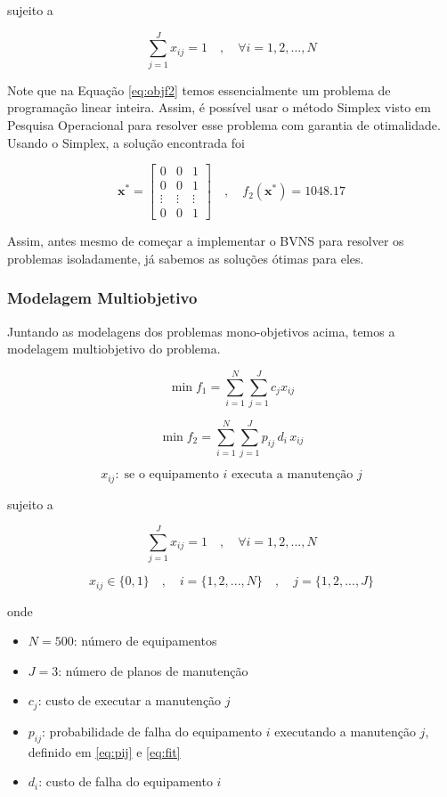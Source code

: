 \documentclass[conference]{IEEEtran}
\newcommand{\un}[1]{\;\text{#1}}
\begin{document}
\noindent sujeito a 

\begin{equation}\label{eq:restf2}
	\sum_{j=1}^{J} x_{ij} = 1 \quad , \quad \forall i = {1, 2, ..., N}
\end{equation}

Note que na Equação \ref{eq:objf2} temos essencialmente um problema de programação linear inteira.
Assim, é possível usar o método Simplex visto em Pesquisa Operacional para resolver esse problema
com garantia de otimalidade. Usando o Simplex, a solução encontrada foi 

\[ \mathbf{x^{*}}  = \begin{bmatrix} 
	0 & 0 & 1 \\
	0 & 0 & 1 \\
	\vdots & \vdots & \vdots \\
	0 &  0      & 1 
	\end{bmatrix} \quad , \quad f_2\left(\mathbf{x^{*}}\right) = 1048.17  \]

Assim, antes mesmo de começar a implementar o BVNS para resolver os problemas isoladamente, 
já sabemos as soluções ótimas para eles.

\subsubsection{Modelagem Multiobjetivo}

Juntando as modelagens dos problemas mono-objetivos acima, temos 
a modelagem multiobjetivo do problema.

\[  \min f_1 = \sum_{i=1}^{N} \sum_{j=1}^{J} c_j x_{ij} \]

\[  \min f_2 = \sum_{i=1}^{N} \sum_{j=1}^{J} p_{ij} \, d_i \, x_{ij} \]

\[  x_{ij}: \un{se o equipamento $i$ executa a manutenção $j$}  \]


\noindent sujeito a

\[ \sum_{j=1}^{J} x_{ij} = 1 \quad , \quad \forall i = {1, 2, ..., N} \]

\[ x_{ij} \in \{0,1\} \quad , \quad i = \{1, 2, ..., N\}  \quad , \quad j = \{1, 2, ..., J\} \]

\noindent onde

\begin{itemize}
	\item $N = 500$: número de equipamentos
	\item $J = 3$: número de planos de manutenção
	\item $c_j$: custo de executar a manutenção $j$
	\item $p_{ij}$: probabilidade de falha do equipamento $i$ executando a manutenção $j$, definido em \ref{eq:pij} e \ref{eq:fit}
	\item $d_{i}$: custo de falha do equipamento $i$
\end{itemize}
\end{document}

